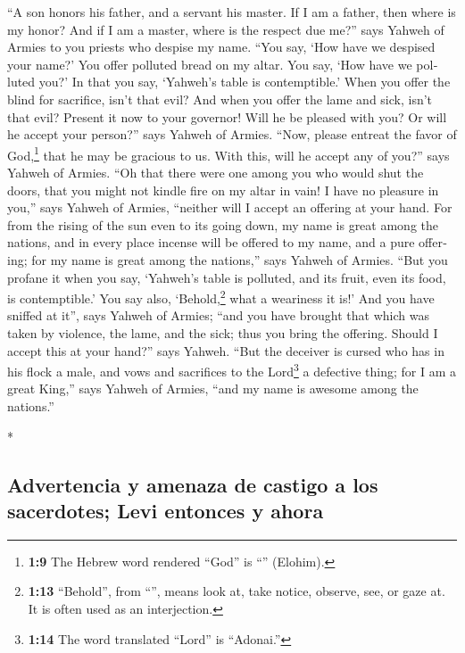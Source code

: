 \begin{paracol}{2}
\begin{otherlanguage}{english}
 ``A son honors his father, and a servant his master. If I
am a father, then where is my honor? And if I am a master, where is the
respect due me?'' says Yahweh of Armies to you priests who despise my
name. ``You say, `How have we despised your name?'  You
offer polluted bread on my altar. You say, `How have we polluted you?'
In that you say, `Yahweh's table is contemptible.'  When
you offer the blind for sacrifice, isn't that evil? And when you offer
the lame and sick, isn't that evil? Present it now to your governor!
Will he be pleased with you? Or will he accept your person?'' says
Yahweh of Armies.  ``Now, please entreat the favor of
God,\footnote{\textbf{1:9} The Hebrew word rendered ``God'' is
  ``'' (Elohim).} that he may be gracious to us. With
this, will he accept any of you?'' says Yahweh of Armies.
 ``Oh that there were one among you who would shut the
doors, that you might not kindle fire on my altar in vain! I have no
pleasure in you,'' says Yahweh of Armies, ``neither will I accept an
offering at your hand.  For from the rising of the sun
even to its going down, my name is great among the nations, and in every
place incense will be offered to my name, and a pure offering; for my
name is great among the nations,'' says Yahweh of Armies.
 ``But you profane it when you say, `Yahweh's table is
polluted, and its fruit, even its food, is contemptible.'
 You say also, `Behold,\footnote{\textbf{1:13}
  ``Behold'', from ``'', means look at, take notice,
  observe, see, or gaze at. It is often used as an interjection.} what a
weariness it is!' And you have sniffed at it'', says Yahweh of Armies;
``and you have brought that which was taken by violence, the lame, and
the sick; thus you bring the offering. Should I accept this at your
hand?'' says Yahweh.  ``But the deceiver is cursed who
has in his flock a male, and vows and sacrifices to the Lord\footnote{\textbf{1:14}
  The word translated ``Lord'' is ``Adonai.''} a defective thing; for I
am a great King,'' says Yahweh of Armies, ``and my name is awesome among
the nations.''

\end{otherlanguage}

\switchcolumn[0]*

\hypertarget{advertencia-y-amenaza-de-castigo-a-los-sacerdotes-levi-entonces-y-ahora}{%
\subsection{Advertencia y amenaza de castigo a los sacerdotes; Levi
entonces y
ahora}\label{advertencia-y-amenaza-de-castigo-a-los-sacerdotes-levi-entonces-y-ahora}}


\end{paracol}
